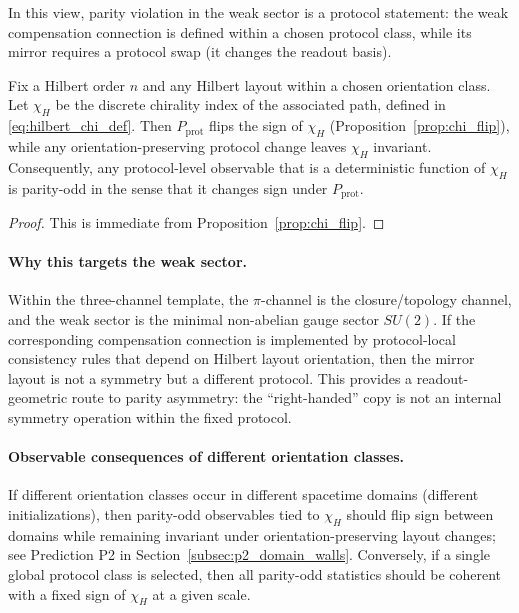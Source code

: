 In this view, parity violation in the weak sector is a protocol statement: the weak compensation connection is defined within a chosen protocol class, while its mirror requires a protocol swap (it changes the readout basis).
\begin{proposition}\label{prop:parity_sign_datum}
Fix a Hilbert order $n$ and any Hilbert layout within a chosen orientation class.
Let $\chi_H$ be the discrete chirality index of the associated path, defined in \eqref{eq:hilbert_chi_def}.
Then $P_{\mathrm{prot}}$ flips the sign of $\chi_H$ (Proposition~\ref{prop:chi_flip}), while any orientation-preserving protocol change leaves $\chi_H$ invariant.
Consequently, any protocol-level observable that is a deterministic function of $\chi_H$ is parity-odd in the sense that it changes sign under $P_{\mathrm{prot}}$.
\end{proposition}
\begin{proof}
This is immediate from Proposition~\ref{prop:chi_flip}.
\end{proof}
\paragraph{Why this targets the weak sector.}
Within the three-channel template, the $\pi$-channel is the closure/topology channel, and the weak sector is the minimal non-abelian gauge sector $SU(2)$.
If the corresponding compensation connection is implemented by protocol-local consistency rules that depend on Hilbert layout orientation, then the mirror layout is not a symmetry but a different protocol.
This provides a readout-geometric route to parity asymmetry: the ``right-handed'' copy is not an internal symmetry operation within the fixed protocol.

\paragraph{Observable consequences of different orientation classes.}
If different orientation classes occur in different spacetime domains (different initializations), then parity-odd observables tied to $\chi_H$ should flip sign between domains while remaining invariant under orientation-preserving layout changes; see Prediction P2 in Section~\ref{subsec:p2_domain_walls}.
Conversely, if a single global protocol class is selected, then all parity-odd statistics should be coherent with a fixed sign of $\chi_H$ at a given scale.

